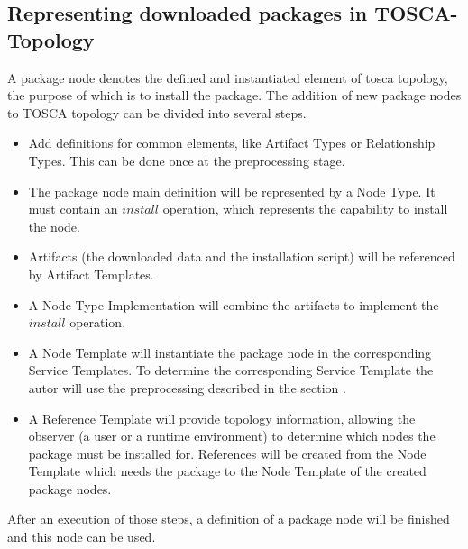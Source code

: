\subsection{Representing downloaded packages in TOSCA-Topology} \label{subs:repres}
A package node denotes the defined and instantiated element of \gls{tosca} topology, the purpose of which is to install the package.
The addition of new package nodes to TOSCA topology can be divided into several steps.
\begin{itemize}
	\item Add definitions for common elements, like Artifact Types or Relationship Types. 
		This can be done once at the preprocessing stage.
	\item The package node main definition will be represented by a Node Type. 
		It must contain an $install$ operation, which represents the capability to install the node.
	\item Artifacts (the downloaded data and the installation script) will be referenced by Artifact Templates.
	\item A Node Type Implementation will combine the artifacts to implement the $install$ operation.
	\item A Node Template will instantiate the package node in the corresponding Service Templates.
		To determine the corresponding Service Template the autor will use the preprocessing described in the section .
	\item A Reference Template will provide topology information, allowing the observer (a user or a runtime environment) to determine which nodes the package must be installed for.
		References will be created from the Node Template which needs the package to the Node Template of the created package nodes.
\end{itemize}
After an execution of those steps, a definition of a package node will be finished and this node can be used.

